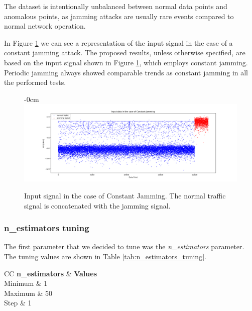 \documentclass[futureinternet,article,submit,pdftex,moreauthors]{Definitions/mdpi}
\begin{document}
The dataset is intentionally unbalanced between normal data points and anomalous points, as jamming attacks are usually rare events compared to normal network operation. 

In Figure \ref{fig:InputSignal} we can see a representation of the input signal in the case of a constant jamming attack. The proposed results, unless otherwise specified, are based on the input signal shown in Figure \ref{fig:InputSignal}, which employs constant jamming. Periodic jamming always showed comparable trends as constant jamming in all the performed tests.


\begin{figure}[H]
    \begin{adjustwidth}{-\extralength}{0cm}
        \centering
        \includegraphics[width=21cm]{img/InputSignal.png}
    \end{adjustwidth}
    \caption{Input signal in the case of Constant Jamming. The normal traffic signal is concatenated with the jamming signal.}
    \label{fig:InputSignal}
\end{figure}


\subsubsection{n\_estimators tuning}

The first parameter that we decided to tune was the \textit{n\_estimators} parameter. The tuning values are shown in Table \ref{tab:n_estimators_tuning}.

\begin{table}[H]
	\caption{n\_estimators tuning values.}\label{tab:n_estimators_tuning}
	\begin{tabularx}{\textwidth}{CC}
	\toprule
	\textbf{n\_estimators} & \textbf{Values} \\
	\midrule
	Minimum & 1 \\
	Maximum & 50 \\
	Step & 1 \\
	\bottomrule
\end{tabularx}
\end{table}
\end{document}
